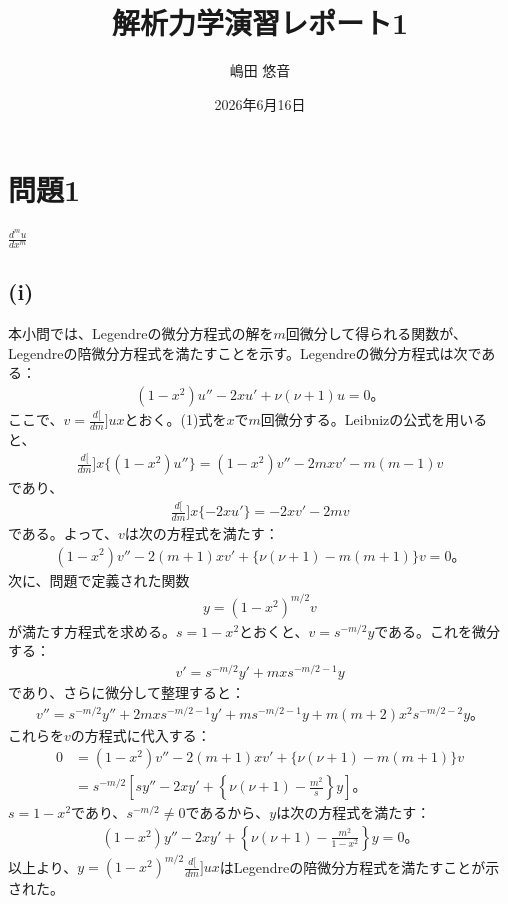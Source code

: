 \documentclass[platex,dvipdfmx,a4paper]{jsarticle}
\title{解析力学演習レポート1}
\author{嶋田 悠音}
\date{2026年6月16日}
\newcommand{\bbn}[2]{\frac{d #1}{d #2}}
\newcommand{\nbbn}[3]{\frac{d^{#1} #2}{d #3^{#1}}}
\begin{document}
  \maketitle
  \section{問題1}
  $\nbbn{m}{u}{x}$

  \subsection*{(i)}
  本小問では、Legendreの微分方程式の解を$m$回微分して得られる関数が、Legendreの陪微分方程式を満たすことを示す。Legendreの微分方程式は次である：
  \begin{align*}
    (1-x^2)u''-2xu'+\nu(\nu+1)u=0。\tag{1}
  \end{align*}
  ここで、$v=\bbn[m]{u}{x}$とおく。(1)式を$x$で$m$回微分する。Leibnizの公式を用いると、
  \begin{align*}
    \bbn[m]{}{x}\{(1-x^2)u''\}=(1-x^2)v''-2mxv'-m(m-1)v
  \end{align*}
  であり、
  \begin{align*}
    \bbn[m]{}{x}\{-2xu'\}=-2xv'-2mv
  \end{align*}
  である。よって、$v$は次の方程式を満たす：
  \begin{align*}
    (1-x^2)v''-2(m+1)xv'+\{\nu(\nu+1)-m(m+1)\}v=0。
  \end{align*}
  次に、問題で定義された関数
  \begin{align*}
    y=(1-x^2)^{m/2}v
  \end{align*}
  が満たす方程式を求める。$s=1-x^2$とおくと、$v=s^{-m/2}y$である。これを微分する：
  \begin{align*}
    v'=s^{-m/2}y'+mxs^{-m/2-1}y
  \end{align*}
  であり、さらに微分して整理すると：
  \begin{align*}
    v''=s^{-m/2}y''+2mxs^{-m/2-1}y'+ms^{-m/2-1}y+m(m+2)x^2s^{-m/2-2}y。
  \end{align*}
  これらを$v$の方程式に代入する：
  \begin{align*}
    0&=(1-x^2)v''-2(m+1)xv'+\{\nu(\nu+1)-m(m+1)\}v \\
     &=s^{-m/2}\left[s y''-2xy'+\left\{\nu(\nu+1)-\frac{m^2}{s}\right\}y\right]。
  \end{align*}
  $s=1-x^2$であり、$s^{-m/2}\neq0$であるから、$y$は次の方程式を満たす：
  \begin{align*}
    (1-x^2)y''-2xy'+\left\{\nu(\nu+1)-\frac{m^2}{1-x^2}\right\}y=0。\tag{2}
  \end{align*}
  以上より、$y=(1-x^2)^{m/2}\bbn[m]{u}{x}$はLegendreの陪微分方程式を満たすことが示された。
  
\end{document}
